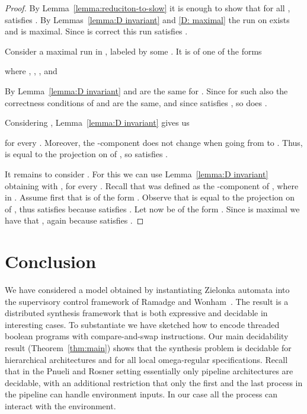 \documentclass[10pt,a4paper]{article}
\begin{document}
\begin{proof}
  By Lemma~\ref{lemma:reduciton-to-slow} it is enough to show that 
  for all ,  satisfies .
  By Lemmas~\ref{lemma:D invariant} and \ref{D: maximal} the run on
   exists and is 
  maximal. Since  is correct this run satisfies .

  Consider a maximal run in , labeled by some
  . It is of one of the forms
  
  where , , , and 

  By Lemma~\ref{lemma:D invariant}  and
   are the same for . Since for such
   also the
  correctness conditions of  and  are the same, and since
   satisfies , so does
  . 

  Considering , Lemma~\ref{lemma:D invariant} gives us
  
 for every
  . Moreover, the -component does not change when going from
   to
  . Thus,
   is equal to the projection on  of , so   satisfies
  . 

 
  It remains to consider . For this we can use Lemma~\ref{lemma:D
    invariant} obtaining
  with
  , for every
  . Recall that  was defined as the -component
  of , where  in . Assume
  first that  is of the form . Observe that  is equal to the
  projection on  of , thus
   satisfies  because  satisfies
  . Let now  be of the form . Since  is maximal we have that , again because  satisfies . 
\end{proof}





\section{Conclusion}

We have considered a model obtained by instantiating Zielonka automata
into the supervisory control framework of Ramadge and
Wonham~\cite{RW89}. The result is a distributed synthesis framework that
is both expressive and decidable in interesting cases. To
substantiate we have sketched how to encode threaded boolean programs
with compare-and-swap instructions. Our main decidability result
(Theorem~\ref{thm:main}) shows that the synthesis problem is decidable
for hierarchical architectures and for all
local omega-regular specifications. Recall that in the Pnueli and Rosner
setting essentially only pipeline architectures are decidable, with
an additional restriction that only the first and the last process in
the pipeline can handle environment inputs. In our case all the
process can interact with the environment.
\end{document}
